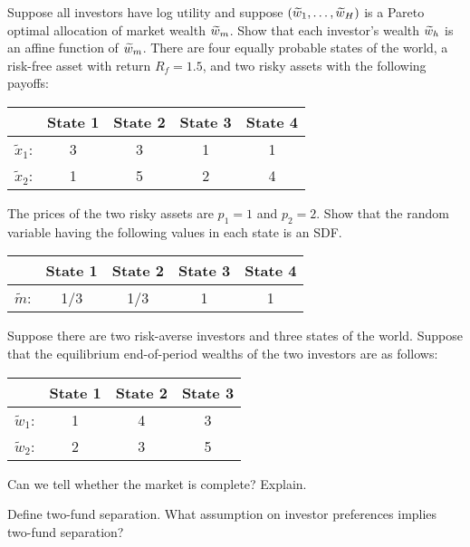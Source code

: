 \item Suppose all investors have log utility and suppose $(\widetilde{w}_1,\ldots,\widetilde{w}_H)$ is a Pareto optimal allocation of market wealth $\widetilde{w}_m$.  Show that each investor's wealth $\widetilde{w}_h$ is an affine function of $\widetilde{w}_m$.
There are four equally probable states of the world, a risk-free asset with return $R_f=1.5$, and two risky assets with the following payoffs:
\begin{center}
\begin{tabular}{lcccc}
& State 1 & State 2 & State 3 & State 4\\
\hline 
$\tilde{x}_1$: & 3 & 3 & 1 & 1 \\
$\tilde{x}_2$: & 1 & 5 & 2 & 4
\end{tabular}
\end{center}
The prices of the two risky assets are $p_1 = 1$ and $p_2=2$. 
Show that the random variable having the following values in each state is an SDF.
\begin{center}
\begin{tabular}{lcccc}
& State 1 & State 2 & State 3 & State 4\\
\hline 
$\tilde{m}$: &1/3 & 1/3 & 1 & 1 
\end{tabular}
\end{center}



 \item {} Suppose there are two risk-averse investors and three states of the world.  Suppose that the equilibrium end-of-period wealths of the two investors are as follows:
 \begin{center}
\begin{tabular}{lccc}
& State 1 & State 2 & State 3\\
\hline 
$\tilde{w}_1$: & 1 & 4 & 3\\
$\tilde{w}_2$: & 2 & 3 & 5
\end{tabular}
\end{center}
Can we tell whether the market is complete? Explain.

\newpage

\item {} Define two-fund separation.  What assumption on investor preferences implies two-fund separation?
\newpage

